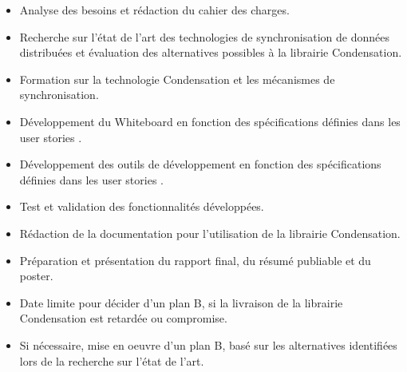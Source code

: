 \begin{itemize}
    \item Analyse des besoins et rédaction du cahier des charges.
    \item Recherche sur l'état de l'art des technologies de synchronisation de données distribuées et évaluation des alternatives possibles à la librairie Condensation.
    \item Formation sur la technologie Condensation et les mécanismes de synchronisation.
    \item Développement du Whiteboard en fonction des spécifications définies dans les user stories .
    \item Développement des outils de développement en fonction des spécifications définies dans les user stories .
    \item Test et validation des fonctionnalités développées.
    \item Rédaction de la documentation pour l'utilisation de la librairie Condensation.
    \item Préparation et présentation du rapport final, du résumé publiable et du poster.
    \item Date limite pour décider d'un plan B, si la livraison de la librairie Condensation est retardée ou compromise.
    \item Si nécessaire, mise en oeuvre d'un plan B, basé sur les alternatives identifiées lors de la recherche sur l'état de l'art.
\end{itemize}

